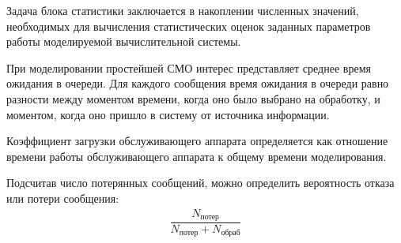 Задача блока статистики заключается в накоплении численных значений, необходимых для вычисления статистических оценок заданных параметров работы моделируемой вычислительной системы.

При моделировании простейшей СМО интерес представляет среднее время ожидания в очереди. Для каждого сообщения время ожидания в очереди равно разности между моментом времени, когда оно было выбрано на обработку, и моментом, когда оно пришло в систему от источника информации.

Коэффициент загрузки обслуживающего аппарата определяется как отношение времени работы обслуживающего аппарата к общему времени моделирования.

Подсчитав число потерянных сообщений, можно определить вероятность отказа или потери сообщения:
%
\begin{gather*}
    \dfrac{N_{\text{потер}}}{N_\text{потер} + N_\text{обраб}}
\end{gather*}